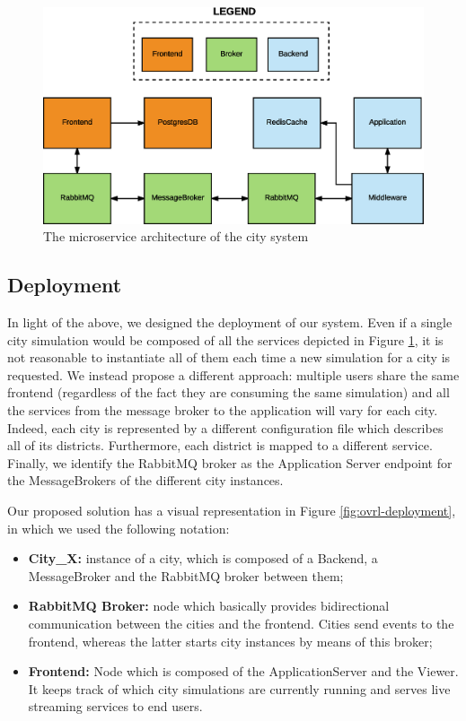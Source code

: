 \begin{figure}[H]
  \centering
  \includegraphics[scale=0.5,keepaspectratio]
    {images/solution/microservices.eps}
  \caption{The microservice architecture of the city system}
  \label{fig:sd-sys-arch-micro}
\end{figure}


\subsection{Deployment}
In light of the above, we designed the deployment of our system. Even
if a single city simulation would be composed of all the services depicted
in Figure
\ref{fig:sd-sys-arch-micro}, it is not reasonable to instantiate all of them
each time a new simulation for a city is requested.
We instead propose a different approach: multiple users share the same frontend
(regardless of the fact they are consuming the same simulation) and all the
services from the message broker to the application will vary for each city.
Indeed, each city is represented by a different configuration file which
describes
all of its districts. Furthermore, each district is mapped to a different
service.
Finally, we identify the RabbitMQ broker as the Application Server endpoint for
the MessageBrokers of the different city instances.

Our proposed solution has a visual representation in Figure
\ref{fig:ovrl-deployment}, in which we used the following notation:

\begin{itemize}
  \item \textbf{City\_X:} instance of a city, which is composed of a Backend,
    a MessageBroker and the RabbitMQ broker between them;
  \item \textbf{RabbitMQ Broker:} node which basically provides bidirectional
    communication between the cities and the frontend. Cities send events to
    the frontend, whereas the latter starts city instances by means of this
    broker;
  \item \textbf{Frontend:} Node which is composed of the ApplicationServer and
    the Viewer. It keeps track of which city simulations are currently
    running and serves live streaming services to end users.
\end{itemize}


